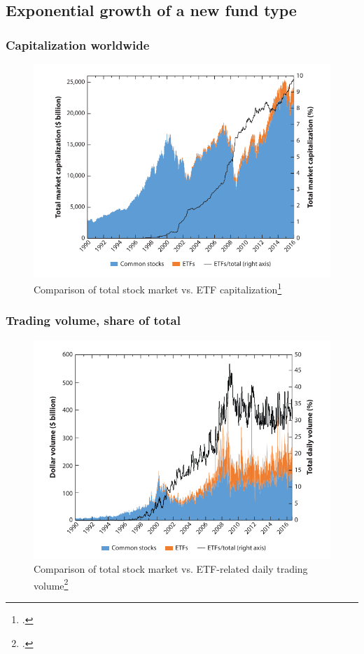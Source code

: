 \documentclass[9pt, usenames, dvipsnames]{beamer}
\begin{document}
\subsection{Exponential growth of a new fund type}
\begin{frame}
  \frametitle{Capitalization worldwide}
  \begin{figure}
    \centering
    \caption{Comparison of total stock market vs. ETF capitalization\footcite[172]{Ben-David2017}}
    \label{fig:Fig1_MarketCap}
    \includegraphics[width = \textwidth, height = 0.65\paperheight, keepaspectratio]{Fig1_MarketCap}
  \end{figure}
\end{frame}


\begin{frame}
  \frametitle{Trading volume, share of total}
  \begin{figure}
    \centering
    \caption{Comparison of total stock market vs. ETF-related daily trading volume\footcite[173]{Ben-David2017}}
    \label{fig:Fig2_Volume}
    \includegraphics[width = \textwidth, height = 0.65\paperheight, keepaspectratio]{Fig2_Volume}
  \end{figure}
\end{frame}
\end{document}
